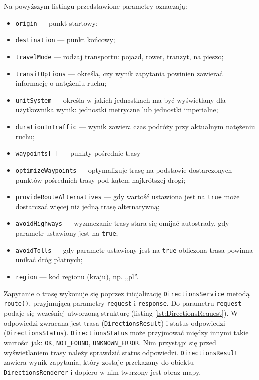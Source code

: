 \documentclass[eng,printmode,oneside]{mgr}
\begin{document}
Na powyższym listingu przedstawione parametry oznaczają:
\begin{itemize}
  \item \texttt{origin} --- punkt startowy;
  \item \texttt{destination} --- punkt końcowy;
  \item \texttt{travelMode} --- rodzaj transportu: pojazd, rower, tranzyt, na
  pieszo;
  \item \texttt{transitOptions} --- określa, czy wynik zapytania powinien zawierać
  informację o natężeniu ruchu;
  \item \texttt{unitSystem} --- określa w jakich jednostkach ma być wyświetlany
  dla użytkownika wynik: jednostki metryczne lub jednostki imperialne;
  \item \texttt{durationInTraffic} --- wynik zawiera czas podróży przy aktualnym
  natężeniu ruchu;
  \item \texttt{waypoints[ ]} --- punkty pośrednie trasy
  \item \texttt{optimizeWaypoints} --- optymalizuje trasę na podstawie
  dostarczonych punktów pośrednich trasy pod kątem najkrótszej drogi;
  \item \texttt{provideRouteAlternatives} --- gdy wartość ustawiona jest na
  \texttt{true} może dostarczać więcej niż jedną trasę alternatywną;
  \item \texttt{avoidHighways} --- wyznaczanie trasy stara się omijać autostrady,
  gdy parametr ustawiony jest na \texttt{true};
  \item \texttt{avoidTolls} --- gdy parametr ustawiony jest na \texttt{true}
  obliczona trasa powinna unikać dróg płatnych;
  \item \texttt{region} --- kod regionu (kraju), np. ,,pl''.
\end{itemize}

Zapytanie o trasę wykonuje się poprzez inicjalizację \texttt{DirectionsService}
metodą \texttt{route()}, przyjmującą parametry \texttt{request} i
\texttt{response}.
Do parametru \texttt{request} podaje się wcześniej utworzoną strukturę (listing
\ref{lst:DirectionsRequest}). W odpowiedzi zwracana jest
trasa (\texttt{DirectionsResult}) i status odpowiedzi
(\texttt{DirectionsStatus}). \texttt{DirectionsStatus} może przyjmować między
innymi takie wartości jak: \texttt{OK}, \texttt{NOT\_FOUND},
\texttt{UNKNOWN\_ERROR}. Nim przystąpi się
przed wyświetlaniem trasy należy sprawdzić status odpowiedzi.
\texttt{DirectionsResult} zawiera wynik zapytania, który zostaje przekazany do obiektu \texttt{DirectionsRenderer} i dopiero w nim
tworzony jest obraz mapy.
\end{document}
